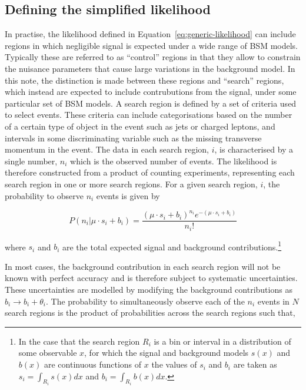 \subsection{Defining the simplified likelihood}
In practise, the likelihood defined in Equation~\ref{eq:generic-likelihood} can include regions in which negligible signal is expected under a wide 
range of BSM models. Typically these are referred to as ``control'' regions in that they allow to constrain the nuisance parameters that  
cause large variations in the background model.
In this note, the distinction is made between these regions and ``search'' regions, which instead 
are expected to include contrubutions from the signal, under some particular set of BSM models. A search region 
is defined by a set of criteria used to select events. These criteria can include categorisations based on 
the number of a certain type of object in the event such as jets or 
charged leptons, and intervals in some discriminating variable such as the missing transverse momentum in the event. The data in each search region, $i$, is characterised 
by a single number, $n_{i}$ which is the observed number of events. The likelihood is therefore constructed from a product of counting 
experiments, representing each search region in one or more search regions. 
For a given search region, $i$, the probability to observe $n_{i}$ events is given by

\begin{equation}
 P(n_{i}|\mu \cdot s_{i}+b_{i}) = \dfrac{(\mu \cdot s_{i}+b_{i})^{n_{i}} e^{-(\mu \cdot s_{i}+b_{i})} }{n_{i}!}
\label{eq:poisson-likelihood}
\end{equation}

where $s_{i}$ and $b_{i}$ are the total expected signal and background contributions.\footnote{In the case 
that the search region $R_{i}$ is a bin or interval in a distribution of some observable $x$, for which the signal and background models $s(x)$ 
and $b(x)$ are continuous functions of $x$ the values of $s_{i}$ and $b_{i}$ are taken as 
$s_{i}=\int_{R_{i}} s(x)dx$ and $b_{i}=\int_{R_{i}} b(x)dx$.}

In most cases, the background contribution in each search region will not be known with perfect accuracy and is therefore 
subject to systematic uncertainties. These uncertainties are modelled by modifying the background contributions as 
$b_{i}\rightarrow b_{i}+\theta_{i}$. 
The probability to simultaneously observe each of the $n_{i}$ events in $N$ search regions is the product of probabilities across the search regions such that,

